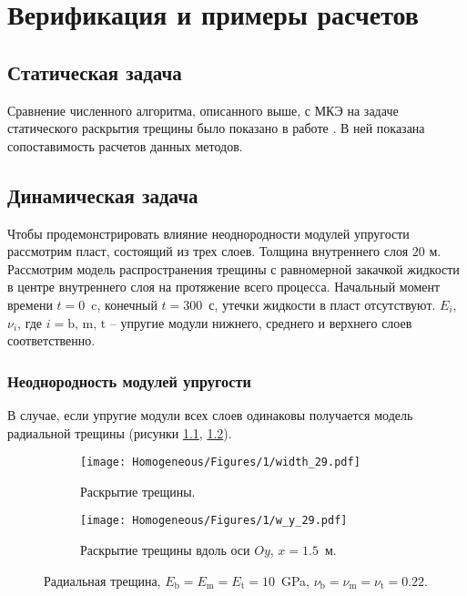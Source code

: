 \chapter{Верификация и примеры расчетов}
\label{sec:verification}

\section{Статическая задача}
\label{subsec:static-fracture}
Сравнение численного алгоритма, описанного выше, с МКЭ на задаче статического раскрытия трещины было показано в работе \cite{Peirce2001UniformAA}. В ней показана сопоставимость расчетов данных методов.



\section{Динамическая задача}
Чтобы продемонстрировать влияние неоднородности модулей упругости рассмотрим пласт, состоящий из трех слоев. Толщина внутреннего слоя $20$ м. Рассмотрим модель распространения трещины с равномерной закачкой жидкости в центре внутреннего слоя на протяжение всего процесса. Начальный момент времени $t = 0$~c, конечный $t = 300$~с, утечки жидкости в пласт отсутствуют. $E_i$, $\nu_i$, где $i=\text{b, m, t}$ -- упругие модули нижнего, среднего и верхнего слоев соответственно. 

\subsection{Неоднородность модулей упругости}
В случае, если упругие модули всех слоев одинаковы получается модель радиальной трещины (рисунки \ref{fig:homogeneous-planar}, \ref{fig:homogeneous-slice}).
\begin{figure}[htbp]
    \centering
    \begin{subfigure}[t]{0.4\textwidth}
        \centering
        \texttt{[image: Homogeneous/Figures/1/width\_29.pdf]}
        \caption{Раскрытие трещины.}
        \label{fig:homogeneous-planar}
    \end{subfigure}
    \hfill 
    \begin{subfigure}[t]{0.55\textwidth}
        \centering
        \texttt{[image: Homogeneous/Figures/1/w\_y\_29.pdf]}
        \caption{Раскрытие трещины вдоль оси $Oy$, $x=1.5$~м.}
        \label{fig:homogeneous-slice}
    \end{subfigure}
    \caption{Радиальная трещина, $E_\text{b} = E_\text{m} = E_\text{t} = 10$~GPa, $\nu_\text{b} = \nu_\text{m} = \nu_\text{t} = 0.22$.}
    \label{fig:homogeneous}
\end{figure}


